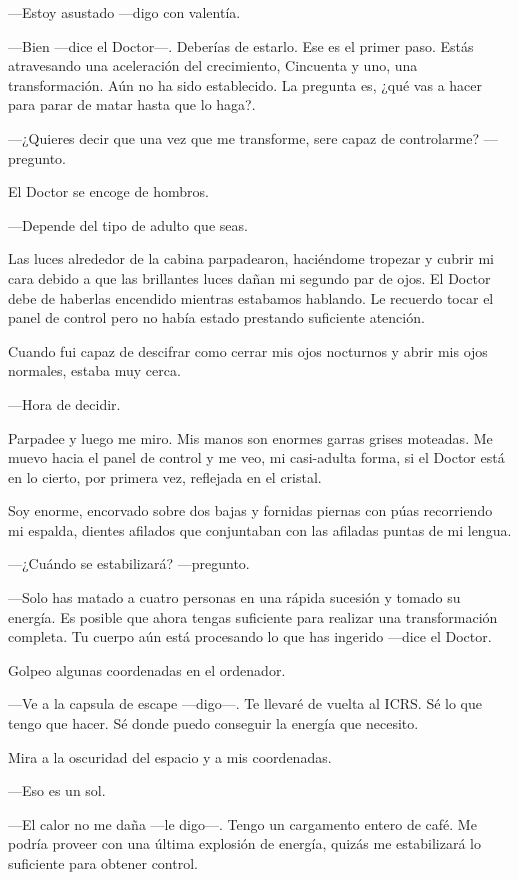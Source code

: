 ---Estoy asustado ---digo con valentía.

---Bien ---dice el Doctor---. Deberías de estarlo. Ese es el primer
paso. Estás atravesando una aceleración del crecimiento, Cincuenta y
uno, una transformación. Aún no ha sido establecido. La pregunta es,
¿qué vas a hacer para parar de matar hasta que lo haga?.

---¿Quieres decir que una vez que me transforme, sere capaz de
controlarme? ---pregunto.

El Doctor se encoge de hombros. 

---Depende del tipo de adulto que seas.

Las luces alrededor de la cabina parpadearon, haciéndome tropezar y
cubrir mi cara debido a que las brillantes luces dañan mi segundo par de
ojos. El Doctor debe de haberlas encendido mientras estabamos
hablando. Le recuerdo tocar el panel de control pero no había estado
prestando suficiente atención.

Cuando fui capaz de descifrar como cerrar mis ojos nocturnos y abrir mis
ojos normales, estaba muy cerca.

---Hora de decidir.

Parpadee y luego me miro. Mis manos son enormes garras grises
moteadas. Me muevo hacia el panel de control y me veo, mi casi-adulta
forma, si el Doctor está en lo cierto, por primera vez, reflejada en el
cristal.

Soy enorme, encorvado sobre dos bajas y fornidas piernas con púas
recorriendo mi espalda, dientes afilados que conjuntaban con las
afiladas puntas de mi lengua.

---¿Cuándo se estabilizará? ---pregunto.

---Solo has matado a cuatro personas en una rápida sucesión y tomado su
energía. Es posible que ahora tengas suficiente para realizar una
transformación completa. Tu cuerpo aún está procesando lo que has
ingerido ---dice el Doctor.

Golpeo algunas coordenadas en el ordenador. 

---Ve a la capsula de escape ---digo---. Te llevaré de vuelta al ICRS.
Sé lo que tengo que hacer. Sé donde puedo conseguir la energía que
necesito.

Mira a la oscuridad del espacio y a mis coordenadas. 

---Eso es un sol.

---El calor no me daña ---le digo---. Tengo un cargamento entero de
café. Me podría proveer con una última explosión de energía, quizás me
estabilizará lo suficiente para obtener control.

